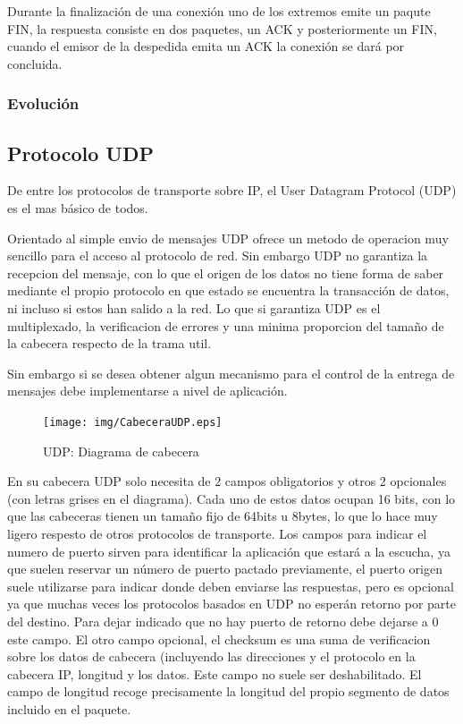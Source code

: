 \documentclass[a4paper,spanish,12pt]{book}
\begin{document}
Durante la finalización de una conexión uno de los extremos emite un paqute FIN, la respuesta consiste en dos paquetes, un ACK y posteriormente un FIN, cuando el emisor de la despedida emita un ACK la conexión se dará por concluida.

\subsubsection{Evolución}

\subsection{Protocolo UDP}

De entre los protocolos de transporte sobre IP, el User Datagram Protocol (UDP) es el mas básico de todos.

Orientado al simple envio de mensajes UDP ofrece un metodo de operacion muy sencillo para el acceso al protocolo de red. Sin embargo UDP no garantiza la recepcion del mensaje, con lo que el origen de los datos no tiene forma de saber mediante el propio protocolo en que estado se encuentra la transacción de datos, ni incluso si estos han salido a la red. Lo que si garantiza UDP es el multiplexado, la verificacion de errores y una minima proporcion del tamaño de la cabecera respecto de la trama util. 

Sin embargo si se desea obtener algun mecanismo para el control de la entrega de mensajes debe implementarse a nivel de aplicación.
\begin{figure}[h]
	\begin{center}
	\texttt{[image: img/CabeceraUDP.eps]}	
\end{center}
\caption{UDP: Diagrama de cabecera}
  \label{fig:CabeceraUDP}
\end{figure}

En su cabecera UDP solo necesita de 2 campos obligatorios y otros 2 opcionales (con letras grises en el diagrama). Cada uno de estos datos ocupan 16 bits, con lo que las cabeceras tienen un tamaño fijo de 64bits u 8bytes, lo que lo hace muy ligero respesto de otros protocolos de transporte. Los campos para indicar el numero de puerto sirven para identificar la aplicación que estará a la escucha, ya que suelen reservar un número de puerto pactado previamente, el puerto origen suele utilizarse para indicar donde deben enviarse las respuestas, pero es opcional ya que muchas veces los protocolos basados en UDP no esperán retorno por parte del destino. Para dejar indicado que no hay puerto de retorno debe dejarse a 0 este campo. El otro campo opcional, el checksum es una suma de verificacion sobre los datos de cabecera (incluyendo las direcciones y el protocolo en la cabecera IP, longitud y los datos. Este campo no suele ser deshabilitado. El campo de longitud recoge precisamente la longitud del propio segmento de datos incluido en el paquete.
\end{document}
